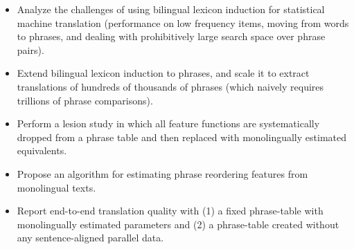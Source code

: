 \documentclass[11pt]{article}
\newcommand{\mtodo}[1]{}
\newcommand{\todop}[2]{\noindent\textcolor{red}{TODO for #1:} #2\\}
\newcommand{\secref}[1]{Section~\ref{#1}}
\begin{document}


\begin{itemize}
  \item Analyze the challenges of using bilingual lexicon induction for statistical machine translation (performance on low frequency items, moving from words to phrases, and dealing with prohibitively large search space over phrase pairs).
  \item Extend bilingual lexicon induction to phrases, and scale it to extract translations of hundreds of thousands of  phrases (which naively requires trillions of phrase comparisons). 
  \item Perform a lesion study in which all feature functions are systematically dropped from a phrase table and then replaced with monolingually estimated equivalents.
  \item Propose an algorithm for estimating phrase reordering features from monolingual texts.
  \item Report end-to-end translation quality with (1) a fixed phrase-table with monolingually estimated parameters and (2) a phrase-table created without any sentence-aligned parallel data.
\end{itemize}
\end{document}
